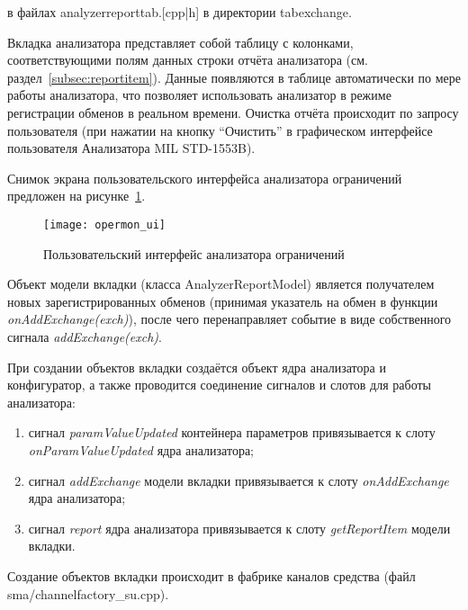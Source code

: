 в файлах analyzerreporttab.[cpp|h] в директории tabexchange.

Вкладка анализатора представляет собой таблицу с колонками, соответствующими 
полям данных строки отчёта анализатора (см. раздел~\ref{subsec:reportitem}). 
Данные появляются в таблице автоматически по мере работы анализатора, что 
позволяет использовать анализатор в режиме регистрации обменов в реальном 
времени. Очистка отчёта происходит по запросу пользователя (при нажатии на 
кнопку ``Очистить'' в графическом интерфейсе пользователя Анализатора MIL 
STD-1553B).

Снимок экрана пользовательского интерфейса анализатора ограничений предложен на 
рисунке~\ref{fig:opermon_ui}.

\begin{figure}[ht]
 \centering
 \texttt{[image: opermon\_ui]}
 \caption{Пользовательский интерфейс анализатора ограничений}
 \label{fig:opermon_ui}
\end{figure}

Объект модели вкладки (класса AnalyzerReportModel) является получателем новых 
зарегистрированных обменов (принимая указатель на обмен в функции 
\textit{onAddExchange(exch)}), после чего перенаправляет событие в 
виде собственного сигнала \textit{addExchange(exch)}.

При создании объектов вкладки создаётся объект ядра анализатора и конфигуратор, 
а также проводится соединение сигналов и слотов для работы анализатора:

\begin{enumerate}
 \item сигнал \textit{paramValueUpdated} контейнера параметров привязывается к 
слоту \textit{onParamValueUpdated} ядра анализатора;
 \item сигнал \textit{addExchange} модели вкладки привязывается к слоту 
\textit{onAddExchange} ядра анализатора;
 \item сигнал \textit{report} ядра анализатора привязывается к слоту 
\textit{getReportItem} модели вкладки.
\end{enumerate}

Создание объектов вкладки происходит в фабрике каналов средства (файл 
sma/channelfactory\_su.cpp).
